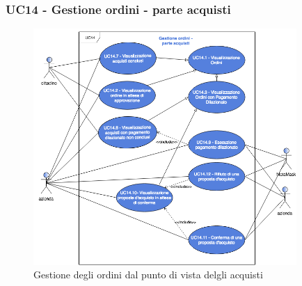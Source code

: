 \subsubsection{UC14 - Gestione ordini - parte acquisti}
\begin{figure}[h]
	\includegraphics[width=10cm]{res/images/UC14ParteAcquisti.png}
	\centering
	\caption{Gestione degli ordini dal punto di vista delgli acquisti}
\end{figure}
